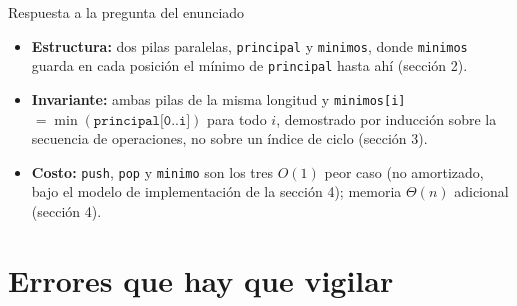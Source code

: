 \documentclass[11pt]{article}
\begin{document}
\begin{resultado}{Respuesta a la pregunta del enunciado}
\begin{itemize}[leftmargin=14pt]
\item \textbf{Estructura:} dos pilas paralelas, \texttt{principal} y \texttt{minimos}, donde
\texttt{minimos} guarda en cada posición el mínimo de \texttt{principal} hasta ahí (sección 2).
\item \textbf{Invariante:} ambas pilas de la misma longitud y \texttt{minimos[i]}
$=\min(\texttt{principal[0..i]})$ para todo $i$, demostrado por inducción sobre la secuencia de operaciones, no sobre un índice de ciclo (sección 3).
\item \textbf{Costo:} \texttt{push}, \texttt{pop} y \texttt{minimo} son los tres $O(1)$ peor caso (no
amortizado, bajo el modelo de implementación de la sección 4); memoria $\Theta(n)$ adicional (sección 4).
\end{itemize}
\end{resultado}

\section*{Errores que hay que vigilar}
\end{document}
